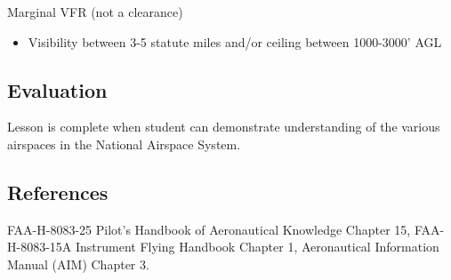 Marginal VFR (not a clearance)
\begin{itemize}
  \item Visibility between 3-5 statute miles and/or ceiling between 1000-3000' AGL
\end{itemize}

\subsection{Evaluation}

Lesson is complete when student can demonstrate understanding of the various
airspaces in the National Airspace System.

\subsection{References}

FAA-H-8083-25 Pilot's Handbook of Aeronautical Knowledge Chapter 15,
FAA-H-8083-15A Instrument Flying Handbook Chapter 1, Aeronautical Information
Manual (AIM) Chapter 3.

